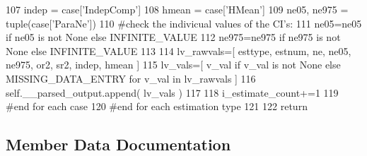 \begin{DoxyCode}
107                 indep = case[\textcolor{stringliteral}{'IndepComp'}] 
108                 hmean = case[\textcolor{stringliteral}{'HMean'}] 
109                 ne05, ne975 = tuple(case[\textcolor{stringliteral}{'ParaNe'}]) 
110                 \textcolor{comment}{#check the indivicual values of the CI's:}
111                 ne05=ne05 \textcolor{keywordflow}{if} ne05 \textcolor{keywordflow}{is} \textcolor{keywordflow}{not} \textcolor{keywordtype}{None} \textcolor{keywordflow}{else} INFINITE\_VALUE 
112                 ne975=ne975 \textcolor{keywordflow}{if} ne975 \textcolor{keywordflow}{is} \textcolor{keywordflow}{not} \textcolor{keywordtype}{None} \textcolor{keywordflow}{else} INFINITE\_VALUE
113 
114                 lv\_rawvals=[ esttype, estnum, ne, ne05, ne975, or2, sr2, indep, hmean  ] 
115                 lv\_vals=[ v\_val \textcolor{keywordflow}{if} v\_val \textcolor{keywordflow}{is} \textcolor{keywordflow}{not} \textcolor{keywordtype}{None} \textcolor{keywordflow}{else} MISSING\_DATA\_ENTRY \textcolor{keywordflow}{for} v\_val \textcolor{keywordflow}{in} lv\_rawvals ]
116                 self.\_\_parsed\_output.append(  lv\_vals  )
117 
118                 i\_estimate\_count+=1
119             \textcolor{comment}{#end for each case}
120         \textcolor{comment}{#end for each estimation type}
121             
122         \textcolor{keywordflow}{return}
\end{DoxyCode}


\subsection{Member Data Documentation}
